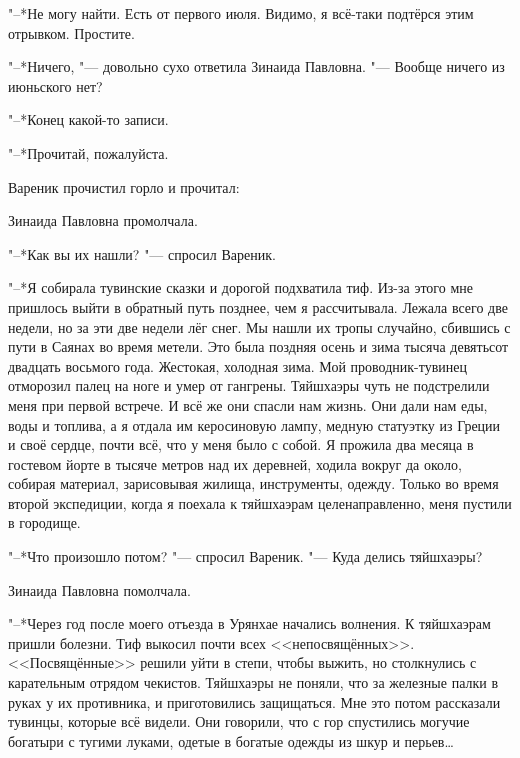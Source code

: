 "--*Не могу найти.
Есть от первого июля.
Видимо, я всё-таки подтёрся этим отрывком.
Простите.

"--*Ничего, "--- довольно сухо ответила Зинаида Павловна.
"--- Вообще ничего из июньского нет?

"--*Конец какой-то записи.

"--*Прочитай, пожалуйста.

Вареник прочистил горло и прочитал:


Зинаида Павловна промолчала.

"--*Как вы их нашли? "--- спросил Вареник.

"--*Я собирала тувинские сказки и дорогой подхватила тиф.
Из-за этого мне пришлось выйти в обратный путь позднее, чем я рассчитывала.
Лежала всего две недели, но за эти две недели лёг снег.
Мы нашли их тропы случайно, сбившись с пути в Саянах во время метели.
Это была поздняя осень и зима тысяча девятьсот двадцать восьмого года.
Жестокая, холодная зима.
Мой проводник-тувинец отморозил палец на ноге и умер от гангрены.
Тяйшхаэры чуть не подстрелили меня при первой встрече.
И всё же они спасли нам жизнь.
Они дали нам еды, воды и топлива, а я отдала им керосиновую лампу, медную статуэтку из Греции и своё сердце, почти всё, что у меня было с собой.
Я прожила два месяца в гостевом йорте в тысяче метров над их деревней, ходила вокруг да около, собирая материал, зарисовывая жилища, инструменты, одежду.
Только во время второй экспедиции, когда я поехала к тяйшхаэрам целенаправленно, меня пустили в городище.

"--*Что произошло потом? "--- спросил Вареник.
"--- Куда делись тяйшхаэры?

Зинаида Павловна помолчала.

"--*Через год после моего отъезда в Урянхае начались волнения.
К тяйшхаэрам пришли болезни.
Тиф выкосил почти всех <<непосвящённых>>.
<<Посвящённые>> решили уйти в степи, чтобы выжить, но столкнулись с карательным отрядом чекистов.
Тяйшхаэры не поняли, что за железные палки в руках у их противника, и приготовились защищаться.
Мне это потом рассказали тувинцы, которые всё видели.
Они говорили, что с гор спустились могучие богатыри с тугими луками, одетые в богатые одежды из шкур и перьев\dots{}

